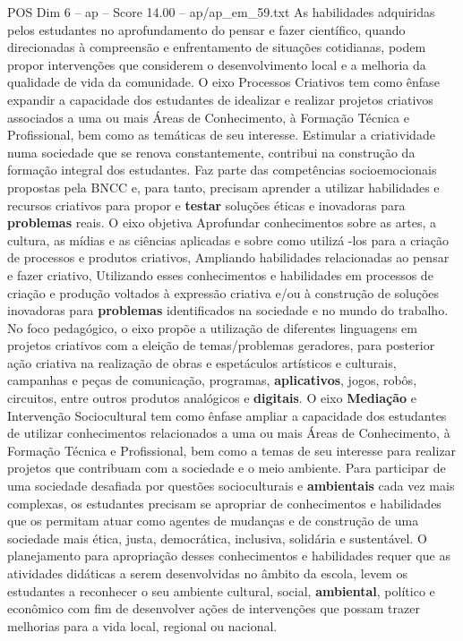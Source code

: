 \begin{textsample}{POS Dim 6 – ap – Score 14.00 – ap/ap\_em\_59.txt}
As habilidades adquiridas pelos estudantes no aprofundamento do pensar e fazer científico, quando direcionadas à compreensão e enfrentamento de situações cotidianas, podem propor intervenções que considerem o desenvolvimento local e a melhoria da qualidade de vida da comunidade.
O eixo Processos Criativos tem como ênfase expandir a capacidade dos estudantes de idealizar e realizar projetos criativos associados a uma ou mais Áreas de Conhecimento, à Formação Técnica e Profissional, bem como as temáticas de seu interesse.
Estimular a criatividade numa sociedade que se renova constantemente, contribui na construção da formação integral dos estudantes.
Faz parte das competências socioemocionais propostas pela BNCC e, para tanto, precisam aprender a utilizar habilidades e recursos criativos para propor e \textbf{testar} soluções éticas e inovadoras para \textbf{problemas} reais.
O eixo objetiva Aprofundar conhecimentos sobre as artes, a cultura, as mídias e as ciências aplicadas e sobre como utilizá -los para a criação de processos e produtos criativos, Ampliando habilidades relacionadas ao pensar e fazer criativo, Utilizando esses conhecimentos e habilidades em processos de criação e produção voltados à expressão criativa e/ou à construção de soluções inovadoras para \textbf{problemas} identificados na sociedade e no mundo do trabalho.
No foco pedagógico, o eixo propõe a utilização de diferentes linguagens em projetos criativos com a eleição de temas/problemas geradores, para posterior ação criativa na realização de obras e espetáculos artísticos e culturais, campanhas e peças de comunicação, programas, \textbf{aplicativos}, jogos, robôs, circuitos, entre outros produtos analógicos e \textbf{digitais}.
O eixo \textbf{Mediação} e Intervenção Sociocultural tem como ênfase ampliar a capacidade dos estudantes de utilizar conhecimentos relacionados a uma ou mais Áreas de Conhecimento, à Formação Técnica e Profissional, bem como a temas de seu interesse para realizar projetos que contribuam com a sociedade e o meio ambiente.
Para participar de uma sociedade desafiada por questões socioculturais e \textbf{ambientais} cada vez mais complexas, os estudantes precisam se apropriar de conhecimentos e habilidades que os permitam atuar como agentes de mudanças e de construção de uma sociedade mais ética, justa, democrática, inclusiva, solidária e sustentável.
O planejamento para apropriação desses conhecimentos e habilidades requer que as atividades didáticas a serem desenvolvidas no âmbito da escola, levem os estudantes a reconhecer o seu ambiente cultural, social, \textbf{ambiental}, político e econômico com fim de desenvolver ações de intervenções que possam trazer melhorias para a vida local, regional ou nacional.

\end{textsample}

